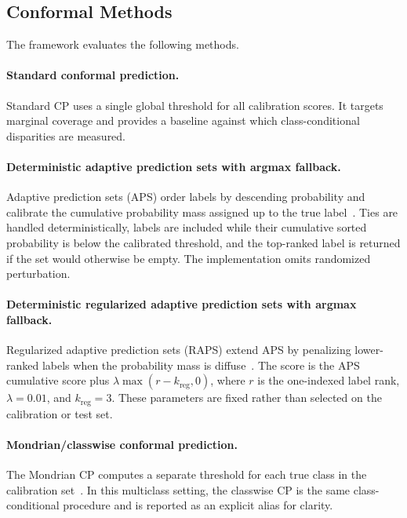﻿\documentclass[preprint,12pt]{elsarticle}
\begin{document}
\subsection{Conformal Methods}

The framework evaluates the following methods.

\paragraph{Standard conformal prediction.}
Standard CP uses a single global threshold for all calibration scores. It targets marginal coverage and provides a baseline against which class-conditional disparities are measured.

\paragraph{Deterministic adaptive prediction sets with argmax fallback.}
Adaptive prediction sets (APS) order labels by descending probability and calibrate the cumulative probability mass assigned up to the true label~\cite{romano2020classification}. Ties are handled deterministically, labels are included while their cumulative sorted probability is below the calibrated threshold, and the top-ranked label is returned if the set would otherwise be empty. The implementation omits randomized perturbation.

\paragraph{Deterministic regularized adaptive prediction sets with argmax fallback.}
Regularized adaptive prediction sets (RAPS) extend APS by penalizing lower-ranked labels when the probability mass is diffuse~\cite{angelopoulos2021raps}. The score is the APS cumulative score plus $\lambda \max(r-k_{\mathrm{reg}},0)$, where $r$ is the one-indexed label rank, $\lambda=0.01$, and $k_{\mathrm{reg}}=3$. These parameters are fixed rather than selected on the calibration or test set.

\paragraph{Mondrian/classwise conformal prediction.}
The Mondrian CP computes a separate threshold for each true class in the calibration set~\cite{vovk2005algorithmic,balasubramanian2014conformal}. In this multiclass setting, the classwise CP is the same class-conditional procedure and is reported as an explicit alias for clarity.
\end{document}
